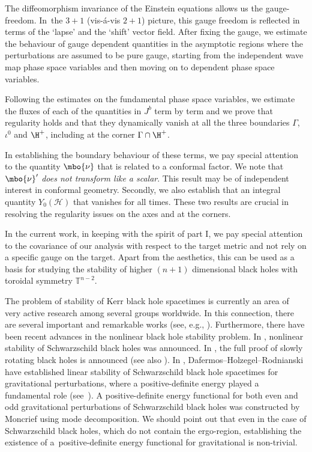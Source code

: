  The diffeomorphism invariance of the Einstein equations allows us the gauge-freedom. In~the ${3+1}$ (vis-\'a-vis $2+1$) picture, this gauge freedom is reflected in terms of the `lapse' and the `shift' vector field. After fixing the gauge, we estimate the behaviour of gauge dependent quantities in the asymptotic regions where the perturbations are assumed to be pure gauge, starting from the independent wave map phase space variables and then moving on to dependent phase space variables.

 Following the estimates on the fundamental phase space variables, we estimate the fluxes of each of the quantities in $J^b$ term by term and we prove that regularity holds and that they dynamically vanish at all the three boundaries $\Gamma$, $\iota^0$ and $\H^+$, including at the corner $\Gamma \cap \H^+$.

 In establishing the boundary behaviour of these terms,
 we pay special attention to the quantity $\mbo{\nu}$ that is related to a conformal factor. We note that $\mbo{\nu}'$ \emph{does not transform like a scalar}.
 This result may be of independent interest in conformal geometry. Secondly, we also establish that an integral quantity $Y_0(\mathcal{H})$ that vanishes for all times. These two results are crucial in resolving the regularity issues on the axes and at the corners.

In the current work, in keeping with the spirit of part I, we pay special attention to the covariance
of our analysis with respect to the target metric and not rely on a specific gauge on the target. Apart from the aesthetics, this can be used as a basis for studying the stability of higher $(n+1)$ dimensional black holes with toroidal symmetry $\mathbb{T}^{n-2}$.

The problem of stability of Kerr black hole spacetimes is currently an area of very active research among several groups worldwide. In this connection, there are several important and remarkable works (see, e.g., \cite{ABBM_19,LB_15_1, LB_15_2,HDR_17,DR_11, HHV_19, SMa_17_1, SMa_17_2, Tato_11}). Furthermore, there have been recent advances in the nonlinear black hole stability problem. In \cite{HDRT_21}, nonlinear stability of Schwarzschild black holes was announced. In \cite{GKS_22}, the full proof of slowly rotating black holes is announced (see also \cite{GKS_20, KS_21}). In \cite{HDR_16}, Dafermos--Holzegel--Rodnianski have established linear stability of Schwarzschild black hole spacetimes for gravitational perturbations, where a positive-definite energy played a fundamental role (see~\cite{GH_16}).
A positive-definite energy functional for both even and odd gravitational perturbations of Schwarzschild black holes was constructed by Moncrief \cite{Moncrief_74} using mode decomposition. We should point out that even in the case of Schwarzschild black holes, which do not contain the ergo-region, establishing the existence of a~positive-definite energy functional for gravitational is non-trivial.

